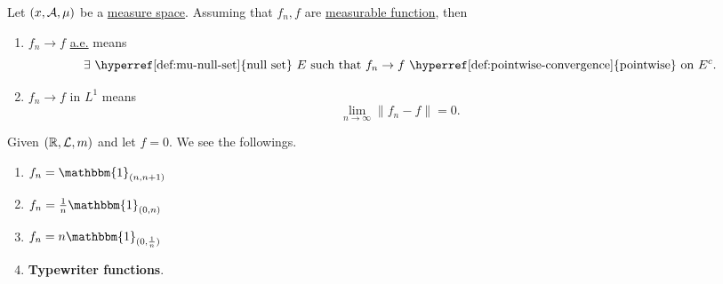 \begin{definition}
	Let \((x, \mathcal{\MakeUppercase{a}} , \mu )\) be a \hyperref[def:measure-space]{measure space}. Assuming that \(f_{n}, f\) are \hyperref[def:measurable-function]{measurable function},
	then
	\begin{enumerate}
		\item \(f_{n}\to f\) \hyperref[def:mu-almost-everywhere]{a.e.} means
		      \[
			      \exists \text{ \hyperref[def:mu-null-set]{null set} } E\text{ such that } f_{n}\to f \text{ \hyperref[def:pointwise-convergence]{pointwise} on } E^{c}.
		      \]
		\item \(f_{n}\to f\) in \(L^1\) means
		      \[
			      \lim\limits_{n \to \infty} \left\lVert f_{n} - f\right\rVert = 0.
		      \]
	\end{enumerate}
\end{definition}
\begin{eg}
	Given \((\mathbb{\MakeUppercase{r}} , \mathcal{\MakeUppercase{l}} , m)\) and let \(f = 0\). We see the followings.
	\begin{enumerate}
		\item \(f_{n} = \mathbbm{1}_{(n, n+1)} \)
		\item \(f_{n} = \frac{1}{n}\mathbbm{1}_{(0, n)} \)
		\item \(f_{n} = n \mathbbm{1}_{(0, \frac{1}{n})} \)
		\item \textbf{Typewriter functions}.
	\end{enumerate}
\end{eg}